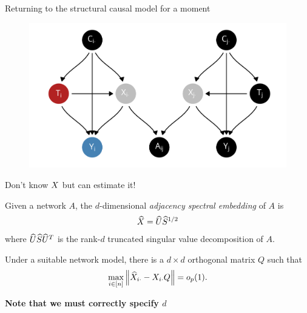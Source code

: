 \documentclass[aspectratio=169]{beamer}
\theoremstyle{remark}
\begin{document}
\begin{frame}{Returning to the structural causal model for a moment}

    \centering

    \begin{figure}
        \includegraphics[scale=0.7]{figures/dags/homophily-mediating.png}
    \end{figure}

\end{frame}

\begin{frame}{Don't know $X$ but can estimate it!}

    \begin{definition}[ASE]

        Given a network $A$, the $d$-dimensional \emph{adjacency spectral embedding} of $A$ is
        \begin{align*}
            \widehat{X} = \widehat{U} \widehat{S}^{1/2}
        \end{align*}
        \noindent where $\widehat{U} \widehat{S} \widehat{U}^T$ is the rank-$d$ truncated singular value decomposition of $A$.
    \end{definition}

    \begin{lemma}
        Under a suitable network model, there is a $d \times d$ orthogonal matrix $Q$ such that
        \begin{equation*}
            \max_{i \in [n]} \, \norm*{\Xhat_{i \cdot} - \X_{i \cdot} Q} = \op{1}.
        \end{equation*}
    \end{lemma}

    \centering

    \textbf{Note that we must correctly specify $d$}
\end{frame}
\end{document}
